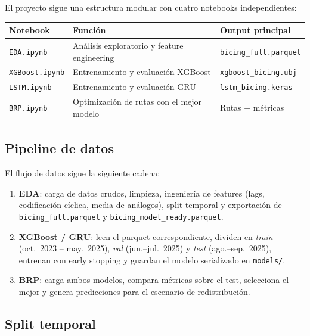 \documentclass[12pt,a4paper]{article}
\begin{document}
El proyecto sigue una estructura modular con cuatro notebooks independientes:

\begin{center}
\begin{tabular}{lll}
\toprule
\textbf{Notebook} & \textbf{Función} & \textbf{Output principal} \\
\midrule
\texttt{EDA.ipynb}     & Análisis exploratorio y feature engineering & \texttt{bicing\_full.parquet} \\
\texttt{XGBoost.ipynb} & Entrenamiento y evaluación XGBoost          & \texttt{xgboost\_bicing.ubj} \\
\texttt{LSTM.ipynb}    & Entrenamiento y evaluación GRU              & \texttt{lstm\_bicing.keras}  \\
\texttt{BRP.ipynb}     & Optimización de rutas con el mejor modelo   & Rutas + métricas \\
\bottomrule
\end{tabular}
\end{center}

\subsection{Pipeline de datos}

El flujo de datos sigue la siguiente cadena:

\begin{enumerate}
  \item \textbf{EDA}: carga de datos crudos, limpieza, ingeniería de features
        (lags, codificación cíclica, media de análogos), split temporal y
        exportación de \texttt{bicing\_full.parquet} y \texttt{bicing\_model\_ready.parquet}.
  \item \textbf{XGBoost / GRU}: leen el parquet correspondiente, dividen en
        \textit{train} (oct.\ 2023 -- may.\ 2025), \textit{val} (jun.--jul.\ 2025)
        y \textit{test} (ago.--sep.\ 2025), entrenan con early stopping y guardan
        el modelo serializado en \texttt{models/}.
  \item \textbf{BRP}: carga ambos modelos, compara métricas sobre el test, selecciona
        el mejor y genera predicciones para el escenario de redistribución.
\end{enumerate}

\subsection{Split temporal}
\end{document}
